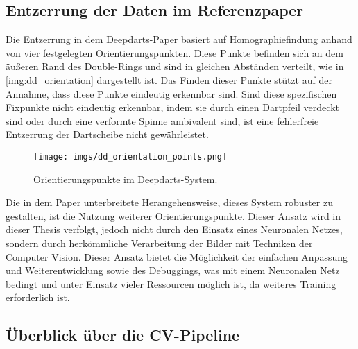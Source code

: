 \subsection{Entzerrung der Daten im Referenzpaper}
\label{sec:impl:cv:paper}

Die Entzerrung in dem Deepdarts-Paper basiert auf Homographiefindung anhand von vier festgelegten Orientierungspunkten. Diese Punkte befinden sich an dem äußeren Rand des Double-Rings und sind in gleichen Abständen verteilt, wie in \autoref{img:dd_orientation} dargestellt ist. Das Finden dieser Punkte stützt auf der Annahme, dass diese Punkte eindeutig erkennbar sind. Sind diese spezifischen Fixpunkte nicht eindeutig erkennbar, indem sie durch einen Dartpfeil verdeckt sind oder durch eine verformte Spinne ambivalent sind, ist eine fehlerfreie Entzerrung der Dartscheibe nicht gewährleistet.

\begin{figure}
    \centering
    \texttt{[image: imgs/dd\_orientation\_points.png]}
    \caption{Orientierungspunkte im Deepdarts-System. \cite{deepdarts}}
    \label{img:dd_orientation}
\end{figure}

Die in dem Paper unterbreitete Herangehensweise, dieses System robuster zu gestalten, ist die Nutzung weiterer Orientierungspunkte. Dieser Ansatz wird in dieser Thesis verfolgt, jedoch nicht durch den Einsatz eines Neuronalen Netzes, sondern durch herkömmliche Verarbeitung der Bilder mit Techniken der Computer Vision. Dieser Ansatz bietet die Möglichkeit der einfachen Anpassung und Weiterentwicklung sowie des Debuggings, was mit einem Neuronalen Netz bedingt und unter Einsatz vieler Ressourcen möglich ist, da weiteres Training erforderlich ist.




\subsection{Überblick über die CV-Pipeline}
\label{sec:impl:cv:pipeline}

